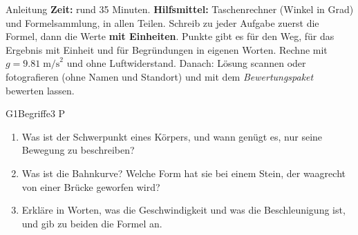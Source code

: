 \documentclass[11pt]{article}
\begin{document}

\begin{lpinfo}{Anleitung}
\textbf{Zeit:} rund 35 Minuten. \textbf{Hilfsmittel:} Taschenrechner (Winkel in Grad) und Formelsammlung, in allen Teilen.
Schreib zu jeder Aufgabe zuerst die Formel, dann die Werte \textbf{mit Einheiten}. Punkte gibt es für den Weg,
für das Ergebnis mit Einheit und für Begründungen in eigenen Worten. Rechne mit $g = 9.81\;\text{m/s}^2$ und ohne Luftwiderstand.
Danach: Lösung scannen oder fotografieren (ohne Namen und Standort) und mit dem \emph{Bewertungspaket} bewerten lassen.
\end{lpinfo}


\begin{lpaufgabe}{G1}{Begriffe}{3 P}
\begin{enumerate}[label=\alph*),leftmargin=*,itemsep=2pt,topsep=2pt]
\item Was ist der Schwerpunkt eines Körpers, und wann genügt es, nur seine Bewegung zu beschreiben?
\item Was ist die Bahnkurve? Welche Form hat sie bei einem Stein, der waagrecht von einer Brücke geworfen wird?
\item Erkläre in Worten, was die Geschwindigkeit und was die Beschleunigung ist, und gib zu beiden die Formel an.
\end{enumerate}
\end{lpaufgabe}
\end{document}
